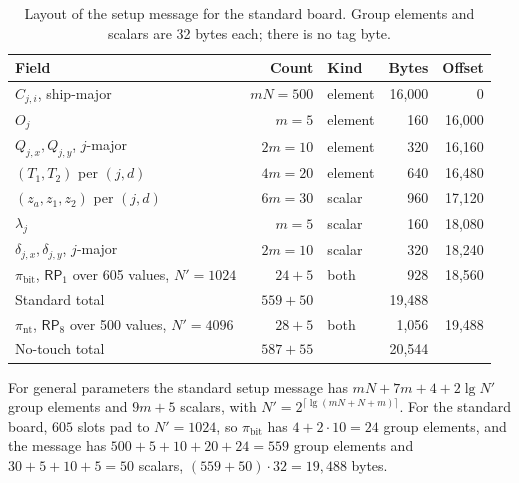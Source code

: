 \documentclass[11pt]{article}
\theoremstyle{definition}
\theoremstyle{remark}
\newcommand{\RP}{\mathsf{RP}}
\begin{document}
\begin{table}[t]
\centering
\begin{tabular}{@{}lrlrr@{}}
\toprule
Field & Count & Kind & Bytes & Offset\\
\midrule
$C_{j,i}$, ship-major & $mN=500$ & element & 16,000 & 0\\
$O_j$ & $m=5$ & element & 160 & 16,000\\
$Q_{j,x},Q_{j,y}$, $j$-major & $2m=10$ & element & 320 & 16,160\\
$(T_1,T_2)$ per $(j,d)$ & $4m=20$ & element & 640 & 16,480\\
$(z_a,z_1,z_2)$ per $(j,d)$ & $6m=30$ & scalar & 960 & 17,120\\
$\lambda_j$ & $m=5$ & scalar & 160 & 18,080\\
$\delta_{j,x},\delta_{j,y}$, $j$-major & $2m=10$ & scalar & 320 & 18,240\\
$\pi_{\mathrm{bit}}$, $\RP_1$ over 605 values, $N'=1024$ & $24+5$ & both & 928 & 18,560\\
\midrule
Standard total & $559+50$ & & 19,488 & \\
$\pi_{\mathrm{nt}}$, $\RP_8$ over 500 values, $N'=4096$ & $28+5$ & both & 1,056 & 19,488\\
No-touch total & $587+55$ & & 20,544 & \\
\bottomrule
\end{tabular}
\caption{Layout of the setup message for the standard board. Group elements and scalars are 32 bytes each; there is no tag byte.}
\label{tab:layout}
\end{table}

For general parameters the standard setup message has $mN+7m+4+2\lg N'$ group elements and $9m+5$ scalars, with $N'=2^{\lceil\lg(mN+N+m)\rceil}$. For the standard board, $605$ slots pad to $N'=1024$, so $\pi_{\mathrm{bit}}$ has $4+2\cdot10=24$ group elements, and the message has $500+5+10+20+24=559$ group elements and $30+5+10+5=50$ scalars, $(559+50)\cdot32=19{,}488$ bytes.
\end{document}

